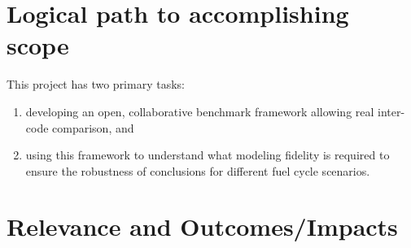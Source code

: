 \section{Logical path to accomplishing scope}

This project has two primary tasks:
\begin{enumerate}
\item developing an open, collaborative benchmark framework allowing real
  inter-code comparison, and
\item using this framework to understand what modeling fidelity is required to
  ensure the robustness of conclusions for different fuel cycle scenarios.
\end{enumerate}






\section{Relevance and Outcomes/Impacts}
